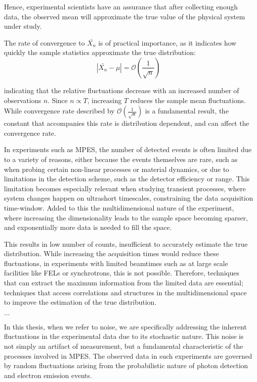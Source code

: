 Hence, experimental scientists have an assurance that after collecting enough data, the observed mean will approximate the true value of the physical system under study.

The rate of convergence to $\bar{X_n}$ is of practical importance, as it indicates how quickly the sample statistics approximate the true distribution:
\begin{equation}
    \left|\bar{X_n} - \mu\right| = \mathcal{O}\left(\frac{1}{\sqrt{n}}\right)
\end{equation}

indicating that the relative fluctuations decrease with an increased number of observations $n$.  Since $n \propto T$, increasing $T$ reduces the sample mean fluctuations. While convergence rate described by $\mathcal{O}\left(\frac{1}{\sqrt{n}}\right)$ is a fundamental result, the constant that accompanies this rate is distribution dependent, and can affect the convergence rate.

In experiments such as \gls{MPES}, the number of detected events is often limited due to a variety of reasons, either because the events themselves are rare, such as when probing certain non-linear processes or material dynamics, or due to limitations in the detection scheme, such as the detector efficiency or range. This limitation becomes especially relevant when studying transient processes, where system changes happen on ultrashort timescales, constraining the data acquisition time-window.  Added to this the multidimensional nature of the experiment, where increasing the dimensionality leads to the sample space becoming sparser, and exponentially more data is needed to fill the space.

This results in low number of counts, insufficient to accurately estimate the true distribution. While increasing the acquisition times would reduce these fluctuations, in experiments with limited \glspl{beamtime} such as at large scale facilities like \glspl{FEL} or synchrotrons, this is not possible. Therefore, techniques that can extract the maximum information from the limited data are essential; techniques that access correlations and structures in the multidimensional space to improve the estimation of the true distribution.

$\dots$

In this thesis, when we refer to noise, we are specifically addressing the inherent fluctuations in the experimental data due to its stochastic nature. This noise is not simply an artifact of measurement, but a fundamental characteristic of the processes involved in \gls{MPES}. The observed data in such experiments are governed by random fluctuations arising from the probabilistic nature of photon detection and electron emission events.


